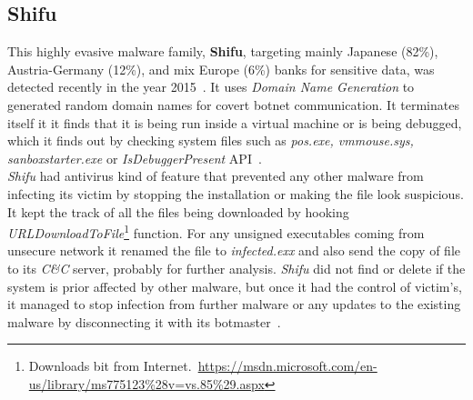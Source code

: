 \subsection{Shifu}
\label{sub:Shifu}
This highly evasive malware family, \textbf{Shifu}, targeting mainly Japanese (82\%), Austria-Germany (12\%), and mix Europe (6\%) banks for sensitive data, was detected recently in the year 2015~\cite[]{secintelshifu}.
It uses \emph{Domain Name Generation} to generated random domain names for covert botnet communication.
It terminates itself it it finds that it is being run inside a virtual machine or is being debugged, which it finds out by checking system files such as \emph{pos.exe, vmmouse.sys, sanboxstarter.exe} or \emph{IsDebuggerPresent} API~\cite[]{mccafeshifu}.\\
\emph{Shifu} had antivirus kind of feature that prevented any other malware from infecting its victim by stopping the installation or making the file look suspicious.
It kept the track of all the files being downloaded by hooking \textit{URLDownloadToFile}\footnote{Downloads bit from Internet.\ \url{https://msdn.microsoft.com/en-us/library/ms775123\%28v=vs.85\%29.aspx}} function.
For any unsigned executables coming from unsecure network it renamed the file to \emph{infected.exx} and also send the copy of file to its \emph{C\&C} server, probably for further analysis.
\emph{Shifu} did not find or delete if the system is prior affected by other malware, but once it had the control of victim's, it managed to stop infection from further malware or any updates to the existing malware by disconnecting it with its botmaster~\cite[]{secintelshifu}.
